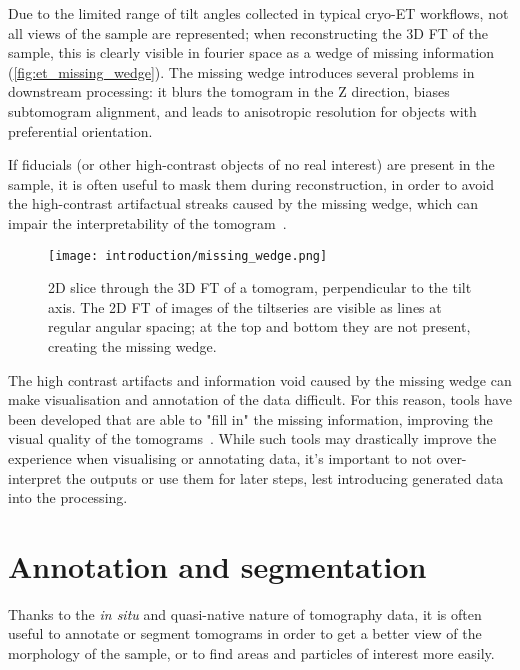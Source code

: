 Due to the limited range of tilt angles collected in typical cryo-ET workflows, not all views of the sample are represented; when reconstructing the 3D FT of the sample, this is clearly visible in fourier space as a wedge of missing information (\autoref{fig:et_missing_wedge}).
The missing wedge introduces several problems in downstream processing: it blurs the tomogram in the Z direction, biases subtomogram alignment, and leads to anisotropic resolution for objects with preferential orientation.

If fiducials (or other high-contrast objects of no real interest) are present in the sample, it is often useful to mask them during reconstruction, in order to avoid the high-contrast artifactual streaks caused by the missing wedge, which can impair the interpretability of the tomogram~\cite{tegunovRealtimeCryoelectronMicroscopy2019,burtTeamtomoFidder2024}.

\begin{figure}[ht]
    \centering
    \texttt{[image: introduction/missing\_wedge.png]}
    \caption[Missing wedge]{2D slice through the 3D FT of a tomogram, perpendicular to the tilt axis. The 2D FT of images of the tiltseries are visible as lines at regular angular spacing; at the top and bottom they are not present, creating the missing wedge.}
    \label{fig:et_missing_wedge}
\end{figure}

The high contrast artifacts and information void caused by the missing wedge can make visualisation and annotation of the data difficult.
For this reason, tools have been developed that are able to "fill in" the missing information, improving the visual quality of the tomograms~\cite{liuIsotropicReconstructionElectron2021,zhangMethodRestoringSignals2023}.
While such tools may drastically improve the experience when visualising or annotating data, it's important to not over-interpret the outputs or use them for later steps, lest introducing generated data into the processing.

\section{Annotation and segmentation}\label{et_annotation_segmentation}
Thanks to the \textit{in situ} and quasi-native nature of tomography data, it is often useful to annotate or segment tomograms in order to get a better view of the morphology of the sample, or to find areas and particles of interest more easily.

